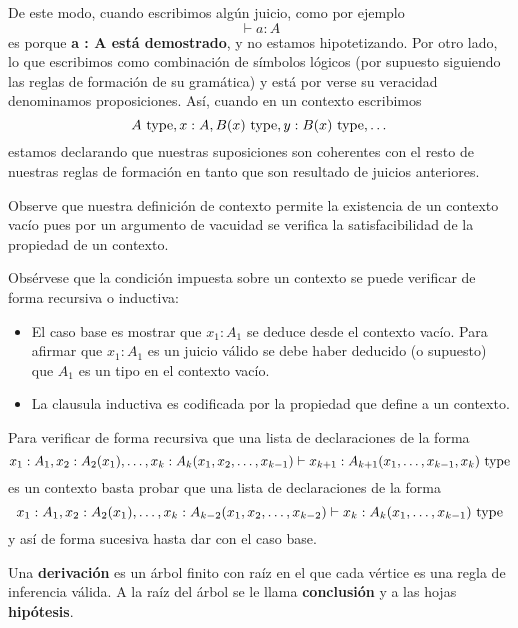 \documentclass{article}
\begin{document}
        De este modo, cuando escribimos algún juicio, como por ejemplo
        $$
            \vdash a : A
        $$
        es porque \textbf{a : A est\'{a} demostrado}, y no estamos 
        hipotetizando. Por otro lado, lo que escribimos como combinaci\'{o}n de 
        s\'{i}mbolos l\'{o}gicos (por supuesto siguiendo las reglas de formación 
        de su gram\'{a}tica) y est\'{a} por verse su veracidad denominamos 
        proposiciones. Así, cuando en un contexto escribimos
        $$
            A\ \mathrm{type}, x : A, B(x)\ \mathrm{type}, y : B(x)\ \mathrm{type}, \dots
        $$
        estamos declarando que nuestras suposiciones son coherentes con el resto
        de nuestras reglas de formación en tanto que son resultado de 
        juicios anteriores.
        \begin{remark}
            Observe que nuestra definición de contexto permite la existencia de un contexto vacío pues por un argumento de vacuidad se verifica la
            satisfacibilidad de la propiedad de un contexto.
        \end{remark}
        \begin{remark}
            Obsérvese que la condición impuesta sobre un contexto se puede verificar de forma recursiva o inductiva:
            \begin{itemize}
                \item El caso base es mostrar que $x_1 : A_1$ se deduce desde el contexto vacío. Para afirmar que $x_1 : A_1$ es un juicio válido se debe haber deducido (o supuesto)
                que $A_1$ es un tipo en el contexto vacío.
                \item La clausula inductiva es codificada por la propiedad que define a un contexto.
            \end{itemize}

            Para verificar de forma recursiva que una lista de declaraciones de la forma 
            $$
                x_1 : A_1, x_2 : A_2(x_1), \dots, x_k : A_k(x_1, x_2, \dots, x_{k-1}) \vdash x_{k+1} : A_{k+1}(x_1, \dots, x_{k-1}, x_k)\ \mathrm{type}
            $$
            es un contexto basta probar que una lista de declaraciones de la forma
            $$
            x_1 : A_1, x_2 : A_2(x_1), \dots, x_k : A_{k-2}(x_1, x_2, \dots, x_{k-2}) \vdash x_{k} : A_{k}(x_1, \dots, x_{k-1})\ \mathrm{type}
            $$
            y así de forma sucesiva hasta dar con el caso base.
        \end{remark}

        \begin{definition}[Derivación]
            Una \textbf{derivación} es un árbol finito con raíz en el que cada vértice es una regla de inferencia válida.
            A la raíz del árbol se le llama \textbf{conclusión} y a las hojas \textbf{hipótesis}.
        \end{definition}
\end{document}
